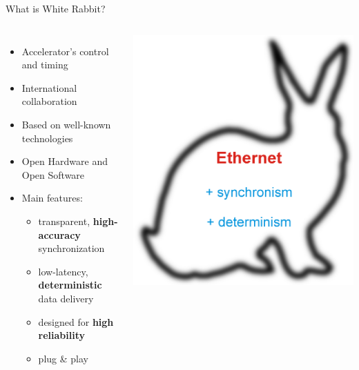 \documentclass[compress,red]{beamer}
\begin{document}
\begin{frame}{What is White Rabbit?}

\begin{columns}[c]
	  \begin{itemize}
		\item Accelerator's control and timing
		\item International collaboration
		\item Based on well-known technologies
		\item Open Hardware and Open Software
		\item Main features:
		\begin{itemize}
		  \item transparent,  {\bf high-accuracy} synchronization
		  \item low-latency,  {\bf deterministic} data delivery
		  \item designed for  {\bf high reliability}
		  \item plug \& play
		\end{itemize}
	  \end{itemize}
		\begin{center}
		\pause
		\hspace{-0.5cm}
		\includegraphics[width=1.1\textwidth]{misc/rabbit.pdf}
		\end{center}
	\end{columns}

\end{frame}
\end{document}
